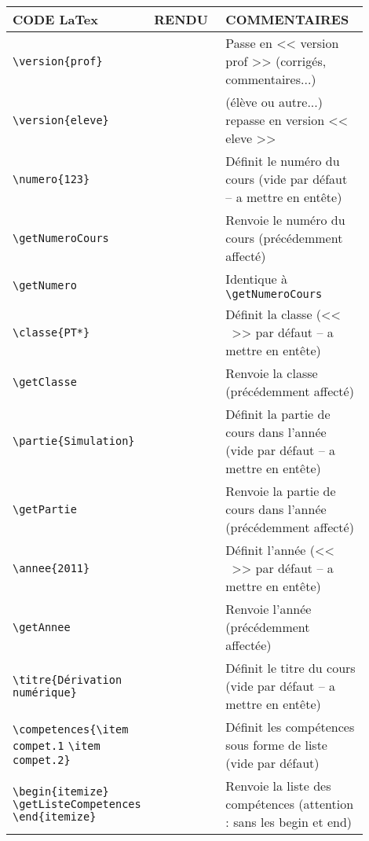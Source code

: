 \documentclass[a4paper,10pt]{article}
\begin{document}
		\begin{tabular}{|m{0.3\linewidth}|m{0.2\linewidth}|m{0.4\linewidth}|}
			\hline
				CODE LaTex			&	RENDU				&	COMMENTAIRES
			\\\hline\hline
				\verb!\version{prof}!		&					&	Passe en << version prof >> (corrigés, commentaires...)
			\\\hline
				\verb!\version{eleve}!		&					&	(élève ou autre...) repasse en version << eleve >>
			\\\hline
				\verb!\numero{123}!		&					&	Définit le numéro du cours (vide par défaut -- a mettre en entête)
			\\\hline
				\verb!\getNumeroCours!		&	\numero{123}\getNumeroCours	&	Renvoie le numéro du cours (précédemment affecté)
			\\\hline
				\verb!\getNumero!		&	\numero{123}\getNumero		&	Identique à \verb!\getNumeroCours!
			\\\hline
				\verb!\classe{PT*}!		&					&	Définit la classe (<< \getClasse\ >> par défaut -- a mettre en entête)
			\\\hline
				\verb!\getClasse!		&	\classe{PT*}\getClasse		&	Renvoie la classe (précédemment affecté)
			\\\hline
				\verb!\partie{Simulation}!	&	\partie{Simulation}		&	Définit la partie de cours dans l'année (vide par défaut -- a mettre en entête)
			\\\hline
				\verb!\getPartie!		&	\partie{Simulation}\getPartie	&	Renvoie la partie de cours dans l'année (précédemment affecté)
			\\\hline
				\verb!\annee{2011}!		&					&	Définit l'année (<< \getAnnee\ >> par défaut -- a mettre en entête)
			\\\hline
				\verb!\getAnnee!		&	\annee{2011}\getAnnee		&	Renvoie l'année (précédemment affectée)
			\\\hline
				\verb!\titre{Dérivation numérique}!		&			&	Définit le titre du cours (vide par défaut -- a mettre en entête)
			\\\hline
				\verb!\competences{\item compet.1! \verb!\item compet.2}!&		&	Définit les compétences sous forme de liste (vide par défaut)
			\\\hline
				\verb!\begin{itemize}! \verb!\getListeCompetences! \verb!\end{itemize}!	&	\competences{\item compet.1\item compet.2}\begin{itemize}\getListeCompetences\end{itemize}	&	Renvoie la liste des compétences (attention : sans les begin et end)
			\\\hline
		\end{tabular}
\end{document}
